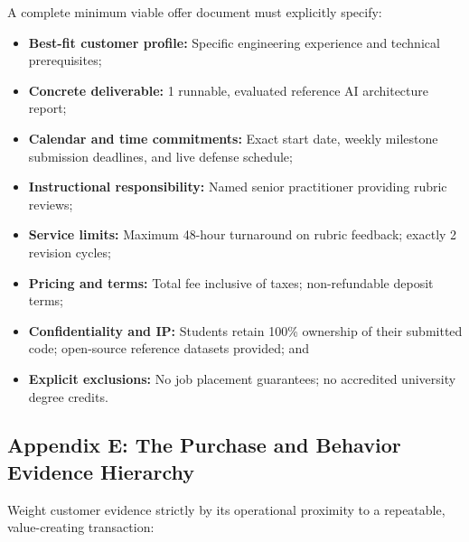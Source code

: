 A complete minimum viable offer document must explicitly specify:
\begin{itemize}
    \item \textbf{Best-fit customer profile:} Specific engineering experience and technical prerequisites;
    \item \textbf{Concrete deliverable:} 1 runnable, evaluated reference AI architecture report;
    \item \textbf{Calendar and time commitments:} Exact start date, weekly milestone submission deadlines, and live defense schedule;
    \item \textbf{Instructional responsibility:} Named senior practitioner providing rubric reviews;
    \item \textbf{Service limits:} Maximum 48-hour turnaround on rubric feedback; exactly 2 revision cycles;
    \item \textbf{Pricing and terms:} Total fee inclusive of taxes; non-refundable deposit terms;
    \item \textbf{Confidentiality and IP:} Students retain 100\% ownership of their submitted code; open-source reference datasets provided; and
    \item \textbf{Explicit exclusions:} No job placement guarantees; no accredited university degree credits.
\end{itemize}

\subsection*{Appendix E: The Purchase and Behavior Evidence Hierarchy}

Weight customer evidence strictly by its operational proximity to a repeatable, value-creating transaction:

